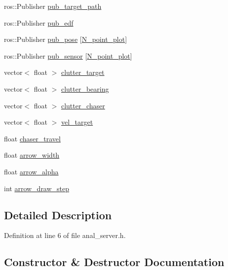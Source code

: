 \begin{DoxyCompactItemize}
\item 
ros\+::\+Publisher \hyperlink{class_anal_server_a96b1bbd4fbd27c527bfb5e5576dc9fcc}{pub\+\_\+target\+\_\+path}
\item 
ros\+::\+Publisher \hyperlink{class_anal_server_a41a4fa268c86b0c441ccce6b8cb9c9f1}{pub\+\_\+edf}
\item 
ros\+::\+Publisher \hyperlink{class_anal_server_ac0cc039c74453254b262b6a4c366ace8}{pub\+\_\+pose} \mbox{[}\hyperlink{anal__server_8h_a811c308324c0423825b236e6eed8d63f}{N\+\_\+point\+\_\+plot}\mbox{]}
\item 
ros\+::\+Publisher \hyperlink{class_anal_server_a3bcdba55d77454f4837a8c2254c9deec}{pub\+\_\+sensor} \mbox{[}\hyperlink{anal__server_8h_a811c308324c0423825b236e6eed8d63f}{N\+\_\+point\+\_\+plot}\mbox{]}
\item 
vector$<$ float $>$ \hyperlink{class_anal_server_a933f748012a639bc8f07edbfaa42d268}{clutter\+\_\+target}
\item 
vector$<$ float $>$ \hyperlink{class_anal_server_a54b7f88580a377bae80c7549528213ff}{clutter\+\_\+bearing}
\item 
vector$<$ float $>$ \hyperlink{class_anal_server_a08f0632361072950ab74c9ddd7357962}{clutter\+\_\+chaser}
\item 
vector$<$ float $>$ \hyperlink{class_anal_server_a346b99fa407494faafc2d0d52e946e51}{vel\+\_\+target}
\item 
float \hyperlink{class_anal_server_ab2cd826904a14b29b2ea370bf5530a7c}{chaser\+\_\+travel}
\item 
float \hyperlink{class_anal_server_ae61096e92e5fa0eaec6ee96511eaf1ac}{arrow\+\_\+width}
\item 
float \hyperlink{class_anal_server_acfb15e946304bbb248e51470692fa209}{arrow\+\_\+alpha}
\item 
int \hyperlink{class_anal_server_a7df3e7d417439f5159feb25fdb11b218}{arrow\+\_\+draw\+\_\+step}
\end{DoxyCompactItemize}


\subsection{Detailed Description}


Definition at line 6 of file anal\+\_\+server.\+h.



\subsection{Constructor \& Destructor Documentation}
